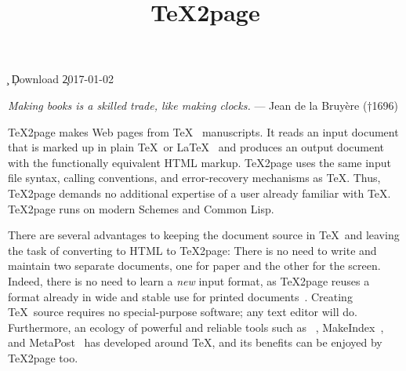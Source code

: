 %




\ifx\TZPtitle\UnDeFiNeD
\def\TZPtitle{TeX2page}\fi

\title{\TeX2page}

\smallskip

\c{}
%
\ifx\inpltdist\Undefined
\ifx\shipout\UnDeFiNeD
\c{Download
}
\else
\c{2017-01-02} %
\fi
\fi
%


\ifx\shipout\UnDeFiNeD
\centerline{}
\fi

{\obeylines\raggedleft
\ifx\shipout\UnDeFiNeD\small\else\eightfont\fi
{\it Making books is a skilled trade,
like making clocks.}
— Jean de la Bruyère (†1696)
}


\medskip


\n
\TeX2page
makes Web pages
from \TeX~\cite{texbook} manuscripts.
It reads an
input document that is marked up in
plain \TeX\ or \LaTeX~\cite{latex}
and
produces an output document with the functionally
equivalent HTML markup.
\TeX2page uses the same input
file syntax, calling conventions, and  error-recovery
mechanisms as \TeX.  Thus, \TeX2page demands no additional
expertise of a user already familiar with \TeX.
\TeX2page runs on modern Schemes and Common Lisp.

There are several advantages to keeping the document
source in \TeX\ and leaving the task of converting to
HTML to \TeX2page:  There is no need to write and
maintain two separate documents, one for paper and the
other for the screen.  Indeed, there is no need to
learn a {\em new} input format, as \TeX2page reuses a
format already in wide and stable use for printed
documents~\cite{tug,ctan}.  Creating \TeX\
source requires no special-purpose software; any text
editor will do.  Furthermore, an ecology of powerful and
reliable tools such as \BibTeX~\cite{bibtex},
MakeIndex~\cite{makeindex}, and
MetaPost~\cite{metapost,mfbook} has developed around \TeX, and
its benefits can be enjoyed by \TeX2page too.

